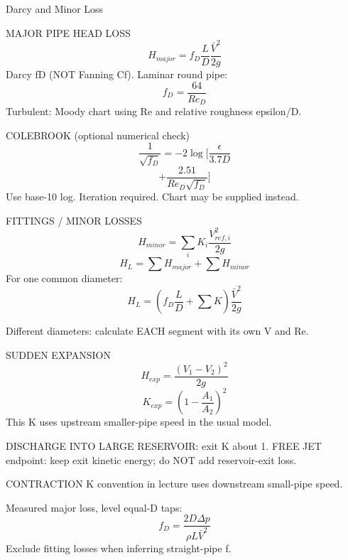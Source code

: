 Darcy and Minor Loss

MAJOR PIPE HEAD LOSS
$$H_{major}=f_D\frac{L}{D}\frac{\bar V^2}{2g}$$
Darcy fD (NOT Fanning Cf).
Laminar round pipe:
$$f_D=\frac{64}{Re_D}$$
Turbulent: Moody chart using Re and relative roughness epsilon/D.

COLEBROOK (optional numerical check)
$$\frac{1}{\sqrt{f_D}}=-2\log[\frac{\epsilon}{3.7D}$$
$$+\frac{2.51}{Re_D\sqrt{f_D}}]$$
Use base-10 log. Iteration required. Chart may be supplied instead.

FITTINGS / MINOR LOSSES
$$H_{minor}=\sum_iK_i\frac{V_{ref,i}^2}{2g}$$
$$H_L=\sum H_{major}+\sum H_{minor}$$
For one common diameter:
$$H_L=(f_D\frac{L}{D}+\sum K)\frac{\bar V^2}{2g}$$

Different diameters: calculate EACH segment with its own V and Re.

SUDDEN EXPANSION
$$H_{exp}=\frac{(V_1-V_2)^2}{2g}$$
$$K_{exp}=(1-\frac{A_1}{A_2})^2$$
This K uses upstream smaller-pipe speed in the usual model.

DISCHARGE INTO LARGE RESERVOIR: exit K about 1.
FREE JET endpoint: keep exit kinetic energy; do NOT add reservoir-exit loss.

CONTRACTION K convention in lecture uses downstream small-pipe speed.

Measured major loss, level equal-D taps:
$$f_D=\frac{2D\Delta p}{\rho L\bar V^2}$$
Exclude fitting losses when inferring straight-pipe f.
